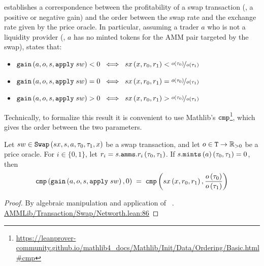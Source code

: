 establishes a correspondence between the profitability of a swap transaction (\ie, a positive or negative gain) and the order between the swap rate and the exchange rate given by the price oracle.  
In particular, assuming a trader $a$ who is not a liquidity provider (\ie, $a$ has no minted tokens for the AMM pair targeted by the swap),  states that:
\begin{itemize}
\item $\code{gain}\left(a, o, s, \code{apply}\;sw\right) < 0 \;\iff\; sx\left(x, r_0, r_1\right) < \nicefrac{o\left(\tau_0\right)}{o\left(\tau_1\right)}$
\item $\code{gain}\left(a, o, s, \code{apply}\;sw\right) = 0 \;\iff\; sx\left(x, r_0, r_1\right) = \nicefrac{o\left(\tau_0\right)}{o\left(\tau_1\right)}$
\item $\code{gain}\left(a, o, s, \code{apply}\;sw\right) > 0 \;\iff\; sx\left(x, r_0, r_1\right) > \nicefrac{o\left(\tau_0\right)}{o\left(\tau_1\right)}$
\end{itemize}
Technically, to formalize this result it is convenient to  use Mathlib's $\code{cmp}$\footnote{\url{https://leanprover-community.github.io/mathlib4_docs/Mathlib/Init/Data/Ordering/Basic.html\#cmp}}, which gives the order between the two parameters.

\begin{lemma}
\label{th:swapvsexch}
Let $sw \in \code{Swap}\left(sx,s,a,\tau_0,\tau_1,x\right)$ be a swap transaction, and let $o \in \code{T} \to \mathbb R_{>0}$ be a price oracle. 
For $i \in \{0,1\}$, let $r_i = s.\code{amms}.r_i\left(\tau_0,\tau_1\right)$. 
If $s.\code{mints}\left(a\right)\left(\tau_0,\tau_1\right) = 0$, then 
$$
\code{cmp}\left(\code{gain}\left(a, o, s, \code{apply}\;sw\right), 0\right) \; = \; \code{cmp}\left(sx\left(x, r_0, r_1\right), \frac{o\left(\tau_0\right)}{o\left(\tau_1\right)}\right)
$$
\end{lemma}
\begin{proof}
By algebraic manipulation and application of ~. \href{https://github.com/danielepusceddu/lean4-amm/blob/paper/AMMLib/Transaction/Swap/Networth.lean#L86}{AMMLib/Transaction/Swap/Networth.lean:86}
\end{proof}

